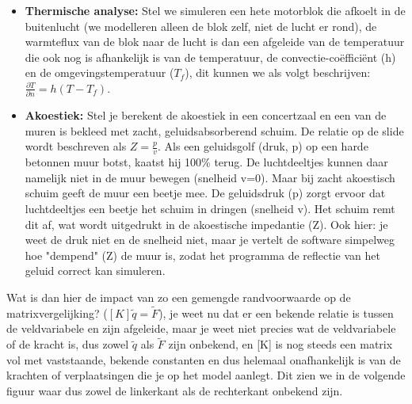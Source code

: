 \documentclass[a4paper,11pt,twoside]{report}
\begin{document}
\begin{itemize}
\begin{itemize}
                    stel we hebben bvb. een brug met een bepaalde stijfheid, als een vrachtwagen hierover rijdt,
                    gaat het steunpunt een beetje inzakken ($u_x$), hoe verder dit steunpunt inzakt, hoe moeilijker
                    het wordt om in te zakken (dat is die stijfheid). We kunnen dit als volgt beschrijven:
                    $F_{Spring} + k u_{x,Spring} = 0$, die $F_{Spring}$ is eigelijk de reactiekracht van de veer,
                    die som is trouwens aan 0 gezet voor de computer want eindig elementen software rekent altijd
                    met krachtenevenwichten.
              \item \textbf{Thermische analyse:} Stel we simuleren een hete motorblok die afkoelt in de
                    buitenlucht (we modelleren alleen de blok zelf, niet de lucht er rond), de warmteflux van de
                    blok naar de lucht is dan een afgeleide van de temperatuur die ook nog is afhankelijk is van de
                    temperatuur, de convectie-co\"effici\"ent (h) en de omgevingstemperatuur ($T_f$), dit kunnen we
                    als volgt beschrijven: $\frac{\partial T}{\partial n} = h (T - T_f)$.
              \item \textbf{Akoestiek:} Stel je berekent de akoestiek in een concertzaal en een van de muren
                    is bekleed met zacht, geluidsabsorberend schuim. De relatie op de slide wordt beschreven als
                    $Z = \frac{p}{v}$. Als een geluidsgolf (druk, p) op een harde betonnen muur botst, kaatst hij
                    100\% terug. De luchtdeeltjes kunnen daar namelijk niet in de muur bewegen (snelheid v=0). Maar
                    bij zacht akoestisch schuim geeft de muur een beetje mee. De geluidsdruk (p) zorgt ervoor dat
                    luchtdeeltjes een beetje het schuim in dringen (snelheid v). Het schuim remt dit af, wat wordt
                    uitgedrukt in de akoestische impedantie (Z). Ook hier: je weet de druk niet en de snelheid
                    niet, maar je vertelt de software simpelweg hoe "dempend" (Z) de muur is, zodat het programma
                    de reflectie van het geluid correct kan simuleren.
          \end{itemize}
          Wat is dan hier de impact van zo een gemengde randvoorwaarde op de matrixvergelijking?
          ($[K]\tilde{q} = \tilde{F}$), je weet nu dat er een bekende relatie is tussen de veldvariabele
          en zijn afgeleide, maar je weet niet precies wat de veldvariabele of de kracht is, dus zowel
          $\tilde{q}$ als $\tilde{F}$ zijn onbekend, en [K] is nog steeds een matrix vol met vaststaande,
          bekende constanten en dus helemaal onafhankelijk is van de krachten of verplaatsingen die je op
          het model aanlegt. Dit zien we in de volgende figuur waar dus zowel de linkerkant als de
          rechterkant onbekend zijn.


\end{itemize}
\end{document}
